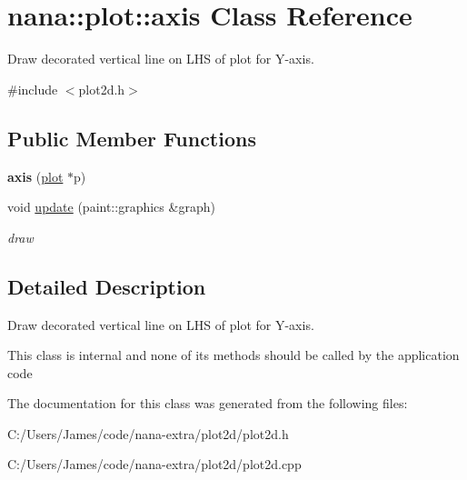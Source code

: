 \hypertarget{classnana_1_1plot_1_1axis}{\section{nana\-:\-:plot\-:\-:axis Class Reference}
\label{classnana_1_1plot_1_1axis}
}


Draw decorated vertical line on L\-H\-S of plot for Y-\/axis.  




{\ttfamily \#include $<$plot2d.\-h$>$}

\subsection*{Public Member Functions}
\begin{DoxyCompactItemize}
\item 
\hypertarget{classnana_1_1plot_1_1axis_afa2029cdac46218e270001ee9ab602fa}{{\bfseries axis} (\hyperlink{classnana_1_1plot_1_1plot}{plot} $\ast$p)}\label{classnana_1_1plot_1_1axis_afa2029cdac46218e270001ee9ab602fa}

\item 
\hypertarget{classnana_1_1plot_1_1axis_ad6625c3dba77c1390547a10b6457ad68}{void \hyperlink{classnana_1_1plot_1_1axis_ad6625c3dba77c1390547a10b6457ad68}{update} (paint\-::graphics \&graph)}\label{classnana_1_1plot_1_1axis_ad6625c3dba77c1390547a10b6457ad68}

\begin{DoxyCompactList}\small\item\em draw \end{DoxyCompactList}\end{DoxyCompactItemize}


\subsection{Detailed Description}
Draw decorated vertical line on L\-H\-S of plot for Y-\/axis. 

This class is internal and none of its methods should be called by the application code 

The documentation for this class was generated from the following files\-:\begin{DoxyCompactItemize}
\item 
C\-:/\-Users/\-James/code/nana-\/extra/plot2d/plot2d.\-h\item 
C\-:/\-Users/\-James/code/nana-\/extra/plot2d/plot2d.\-cpp\end{DoxyCompactItemize}
